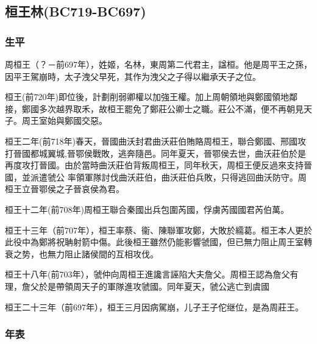 
\subsection{桓王林\tiny{(BC719-BC697)}}

\subsubsection{生平}

周桓王（？－前697年），姓姬，名林，東周第二代君主，諡桓。他是周平王之孫，因平王駕崩時，太子洩父早死，其作为洩父之子得以繼承天子之位。

桓王(前720年)即位後，計劃削弱卿權以加強王權。加上周朝領地與鄭國領地鄰接，鄭國多次越界取禾，故桓王罷免了鄭莊公卿士之職。莊公不滿，便不再朝見天子。周王室始與鄭國交惡。

桓王二年(前718年)春天，晉國曲沃封君曲沃莊伯賄賂周桓王，聯合鄭國、邢國攻打晉國都城翼城,晉鄂侯戰敗，逃奔隨邑。同年夏天，晉鄂侯去世，曲沃莊伯於是再度攻打晉國。由於當時曲沃莊伯背叛周桓王，同年秋天，周桓王便反過來支持晉國，並派遣虢公 率領軍隊討伐曲沃莊伯，曲沃莊伯兵敗，只得逃回曲沃防守。周桓王立晉鄂侯之子晉哀侯為君。

桓王十二年(前708年)周桓王聯合秦國出兵包圍芮國，俘虜芮國國君芮伯萬。

桓王十三年（前707年），桓王率蔡、衞、陳聯軍攻鄭，大敗於繻葛。桓王本人更於此役中為鄭將祝聃射箭中傷。此後桓王雖然仍能影響虢國，但已無力阻止周王室轉衰之势，也無力阻止諸侯間的互相攻伐。

桓王十八年(前703年），虢仲向周桓王進讒言誣陷大夫詹父。周桓王認為詹父有理，詹父於是帶領周天子的軍隊進攻虢國。同年夏天，虢公逃亡到虞國

桓王二十三年（前697年），桓王三月因病駕崩，儿子王子佗继位，是為周莊王。

\subsubsection{年表}

